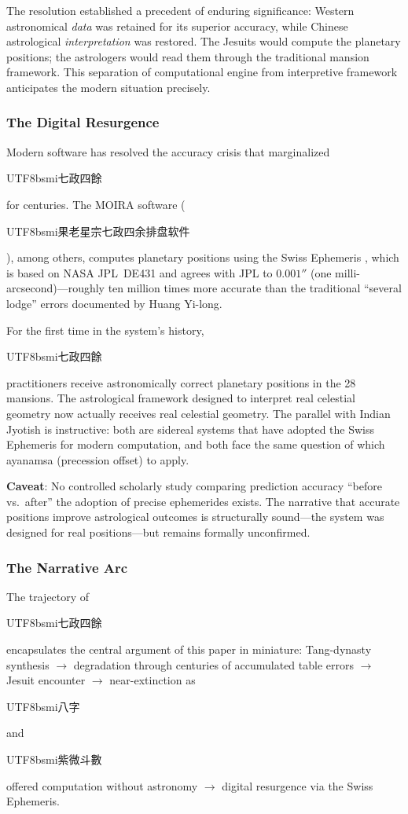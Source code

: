 \documentclass[10pt,a4paper]{article}
\newcommand{\zh}[1]{\begin{CJK}{UTF8}{bsmi}#1\end{CJK}}
\begin{document}
The resolution established a precedent of enduring significance: Western
astronomical \emph{data} was retained for its superior accuracy, while
Chinese astrological \emph{interpretation} was restored. The Jesuits
would compute the planetary positions; the astrologers would read them
through the traditional mansion framework. This separation of
computational engine from interpretive framework anticipates the modern
situation precisely.

\subsubsection{The Digital Resurgence}

Modern software has resolved the accuracy crisis that marginalized
\zh{七政四餘} for centuries. The MOIRA software
(\zh{果老星宗七政四余排盘软件}), among others, computes planetary
positions using the Swiss Ephemeris \cite{swiss_ephemeris}, which is based
on NASA JPL~DE431 and agrees with JPL to $0.001''$ (one
milli-arcsecond)---roughly ten million times more accurate than the
traditional ``several lodge'' errors documented by Huang Yi-long.

For the first time in the system's history, \zh{七政四餘} practitioners
receive astronomically correct planetary positions in the 28 mansions.
The astrological framework designed to interpret real celestial geometry
now actually receives real celestial geometry. The parallel with Indian
Jyotish is instructive: both are sidereal systems that have adopted the
Swiss Ephemeris for modern computation, and both face the same question
of which ayanamsa (precession offset) to apply.

\textbf{Caveat}: No controlled scholarly study comparing prediction
accuracy ``before vs.\ after'' the adoption of precise ephemerides
exists. The narrative that accurate positions improve astrological
outcomes is structurally sound---the system was designed for real
positions---but remains formally unconfirmed.

\subsubsection{The Narrative Arc}

The trajectory of \zh{七政四餘} encapsulates the central argument of
this paper in miniature: Tang-dynasty synthesis $\to$ degradation through
centuries of accumulated table errors $\to$ Jesuit encounter $\to$
near-extinction as \zh{八字} and \zh{紫微斗數} offered computation
without astronomy $\to$ digital resurgence via the Swiss Ephemeris.
\end{document}
